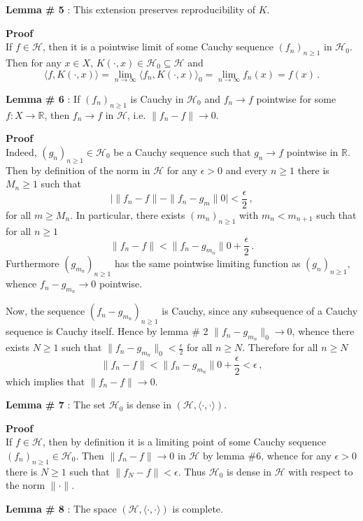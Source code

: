 \documentclass[a4paper]{article}
\newcommand{\Real}{\mathbb{R}}
\newcommand{\Hcal}{\mathcal{H}}
\begin{document}
\noindent\textbf{Lemma \# 5} : This extension preserves reproducibility of $K$.

\noindent\textbf{Proof} \hfill \\
If $f\in \Hcal$, then it is a pointwise limit of some Cauchy sequence $(f_n)_{n\geq1}$
in $\Hcal_0$. Then for any $x\in X$, $K(\cdot, x)\in \Hcal_0 \subseteq \Hcal$ and
\[
\langle f, K(\cdot, x)\rangle
= \lim_{n\to\infty} \langle f_n, K(\cdot, x)\rangle_0
= \lim_{n\to\infty} f_n(x)
= f(x)\,.
\]

\noindent\textbf{Lemma \# 6} : If $(f_n)_{n\geq1}$ is Cauchy in $\Hcal_0$ and $f_n\to f$
pointwise for some $f:X\to \Real$, then $f_n\to f$ in $\Hcal$, i.e. $\|f_n-f\|\to 0$.

\noindent\textbf{Proof} \hfill \\
Indeed, $(g_n)_{n\geq1}\in \Hcal_0$ be a Cauchy sequence such that $g_n \to f$ pointwise
in $\Real$. Then by definition of the norm in $\Hcal$ for any $\epsilon>0$ and every
$n\geq 1$ there is $M_n\geq 1$ such that 
\[ \bigl| \|f_n - f\| - \|f_n - g_m\|0 \bigr| < \frac{\epsilon}{2} \,, \]
for all $m\geq M_n$. In particular, there exists $(m_n)_{n\geq1}$ with $m_n < m_{n+1}$
such that for all $n\geq1$
\[ \|f_n - f\| < \|f_n - g_{m_n}\|0 + \frac{\epsilon}{2} \,. \]
Furthermore $(g_{m_n})_{n\geq1}$ has the same pointwise limiting function as
$(g_n)_{n\geq1}$, whence $f_n-g_{m_n}\to 0$ pointwise.

Now, the sequence $(f_n-g_{m_n})_{n\geq1}$ is Cauchy, since any subsequence of a
Cauchy sequence is Cauchy itself. Hence by lemma \# 2 $\|f_n-g_{m_n}\|_0 \to 0$,
whence there exists $N\geq1$ such that $\|f_n - g_{m_n}\|_0 < \frac{\epsilon}{2}$ for
all $n\geq N$. Therefore for all $n\geq N$
\[ \|f_n - f\| < \|f_n - g_{m_n}\|0 + \frac{\epsilon}{2}
			   < \epsilon \,, \]
which implies that $\|f_n - f\|\to 0$.

\noindent\textbf{Lemma \# 7} : The set $\Hcal_0$ is dense in $(\Hcal,\langle\cdot,\cdot\rangle)$.

\noindent\textbf{Proof} \hfill \\
If $f\in\Hcal$, then by definition it is a limiting point of some Cauchy sequence
$(f_n)_{n\geq1}\in\Hcal_0$. Then $\|f_n-f\|\to 0$ in $\Hcal$ by lemma \#6, whence
for any $\epsilon>0$ there is $N\geq1$ such that $\|f_N-f\|<\epsilon$. Thus $\Hcal_0$
is dense in $\Hcal$ with respect to the norm $\|\cdot\|$.

\noindent\textbf{Lemma \# 8} : The space $(\Hcal,\langle\cdot,\cdot\rangle)$ is complete.
\end{document}
